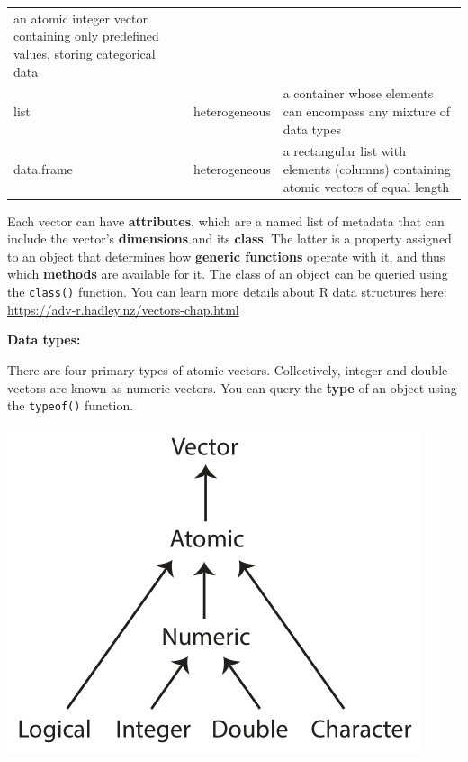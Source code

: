 \documentclass[]{book}
\begin{document}
\begin{longtable}[]{@{}lll@{}}
\begin{minipage}[t]{0.71\columnwidth}
an atomic integer vector containing only predefined values, storing categorical data\strut
\end{minipage}\tabularnewline
\begin{minipage}[t]{0.10\columnwidth}\raggedright
list\strut
\end{minipage} & \begin{minipage}[t]{0.10\columnwidth}\raggedright
heterogeneous\strut
\end{minipage} & \begin{minipage}[t]{0.71\columnwidth}\raggedright
a container whose elements can encompass any mixture of data types\strut
\end{minipage}\tabularnewline
\begin{minipage}[t]{0.10\columnwidth}\raggedright
data.frame\strut
\end{minipage} & \begin{minipage}[t]{0.10\columnwidth}\raggedright
heterogeneous\strut
\end{minipage} & \begin{minipage}[t]{0.71\columnwidth}\raggedright
a rectangular list with elements (columns) containing atomic vectors of equal length\strut
\end{minipage}\tabularnewline
\bottomrule
\end{longtable}

Each vector can have \textbf{attributes}, which are a named list of metadata that can include the vector's \textbf{dimensions} and its \textbf{class}. The latter is a property assigned to an object that determines how \textbf{generic functions} operate with it, and thus which \textbf{methods} are available for it. The class of an object can be queried using the \texttt{class()} function. You can learn more details about R data structures here: \url{https://adv-r.hadley.nz/vectors-chap.html}

\textbf{Data types:}

There are four primary types of atomic vectors. Collectively, integer and double vectors are known as numeric vectors. You can query the \textbf{type} of an object using the \texttt{typeof()} function.

\includegraphics{R/RDataWrangling/images/summary_tree_atomic.png}
\end{document}
